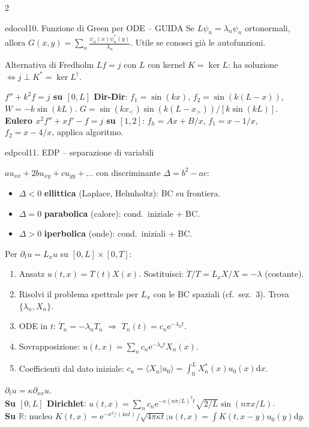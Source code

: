 \documentclass[10pt,a4paper]{article}
\newcommand{\R}{\mathbb{R}}
\newcommand{\dd}{\mathrm{d}}
\newcommand{\eu}{\mathrm{e}}
\newcommand{\braket}[2]{\langle#1|#2\rangle}
\begin{document}
\begin{multicols}{2}
\begin{secbox}{edocol}{10. Funzione di Green per ODE -- GUIDA}
Se $L\psi_n=\lambda_n\psi_n$ ortonormali, allora $G(x,y)=\sum_n\frac{\psi_n(x)\psi_n^*(y)}{\lambda_n}$. Utile se conosci già le autofunzioni.

\begin{teobox}{Alternativa di Fredholm}
$Lf=j$ con $L$ con kernel $K=\ker L$: ha soluzione $\iff j\perp K^*=\ker L^\dagger$.
\end{teobox}

\textbf{$f''+k^2f=j$ su $[0,L]$ Dir-Dir}: $f_1=\sin(kx)$, $f_2=\sin(k(L-x))$, $W=-k\sin(kL)$. $G=\sin(kx_<)\sin(k(L-x_>))/[k\sin(kL)]$.\\
\textbf{Eulero $x^2f''+xf'-f=j$ su $[1,2]$}: $f_h=Ax+B/x$, $f_1=x-1/x$, $f_2=x-4/x$, applica algoritmo.

\end{secbox}

\begin{secbox}{edpcol}{11. EDP -- separazione di variabili}

$au_{xx}+2bu_{xy}+cu_{yy}+\dots$ con discriminante $\Delta=b^2-ac$:
\begin{itemize}
\item $\Delta<0$ \textbf{ellittica} (Laplace, Helmholtz): BC su frontiera.
\item $\Delta=0$ \textbf{parabolica} (calore): cond.\ iniziale $+$ BC.
\item $\Delta>0$ \textbf{iperbolica} (onde): cond.\ iniziali + BC.
\end{itemize}

Per $\partial_tu=L_xu$ su $[0,L]\times[0,T]$:
\begin{enumerate}
\item Ansatz $u(t,x)=T(t)X(x)$. Sostituisci: $\dot T/T=L_xX/X=-\lambda$ (costante).
\item Risolvi il problema spettrale per $L_x$ con le BC spaziali (cf.\ sez.\ 3). Trova $\{\lambda_n,X_n\}$.
\item ODE in $t$: $\dot T_n=-\lambda_n T_n$ $\Rightarrow$ $T_n(t)=c_n\eu^{-\lambda_n t}$.
\item Sovrapposizione: $u(t,x)=\sum_nc_n\eu^{-\lambda_nt}X_n(x)$.
\item Coefficienti dal dato iniziale: $c_n=\braket{X_n}{u_0}=\int_0^L X_n^*(x)u_0(x)\dd x$.
\end{enumerate}

$\partial_tu=\kappa\partial_{xx}u$.\\
\textbf{Su $[0,L]$ Dirichlet}: $u(t,x)=\sum_nc_n\eu^{-\kappa(n\pi/L)^2t}\sqrt{2/L}\sin(n\pi x/L)$.\\
\textbf{Su $\R$}: nucleo $K(t,x)=\eu^{-x^2/(4\kappa t)}/\sqrt{4\pi\kappa t}$;\;$u(t,x)=\int K(t,x-y)u_0(y)\dd y$.


\end{secbox}
\end{multicols}
\end{document}

